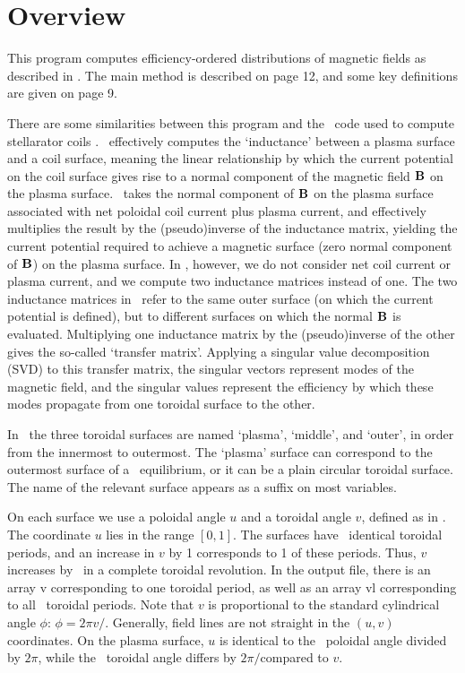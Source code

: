 \chapter{Overview}

This program computes efficiency-ordered distributions of magnetic fields as described in \cite{boozer2015}.  The main method is described on page 12, and some key definitions are given on page 9.

There are some similarities between this program and the \nescoil~code used to compute stellarator coils \cite{nescoil}.
\nescoil~effectively computes the `inductance' between a plasma surface and a coil surface, meaning the linear
relationship by which the current potential on the coil surface gives rise to a normal component of the magnetic field ${\mathbf B}$ on the plasma
surface.  \nescoil~takes the normal component of ${\mathbf B}$ on the plasma surface associated with net poloidal coil current plus plasma
current, and effectively multiplies the result by the (pseudo)inverse of the inductance matrix, yielding the current potential required
to achieve a magnetic surface (zero normal component of ${\mathbf B}$) on the plasma surface.  In \regcoil, however,
we do not consider net coil current or plasma current, and we compute two inductance matrices instead of one.  The two inductance matrices
in \regcoil~refer to the same outer surface (on which the current potential is defined), but to different surfaces on which the normal ${\mathbf B}$
is evaluated. Multiplying one inductance matrix by the (pseudo)inverse of the other gives the so-called `transfer matrix'.
Applying a singular value decomposition (SVD) to this transfer matrix, the singular vectors represent modes of the magnetic field,
and the singular values represent the efficiency by which these modes propagate from one toroidal surface to the other.

In \regcoil~the three toroidal surfaces are named `plasma', `middle', and `outer', in order from the innermost to outermost. The
`plasma' surface can correspond to the outermost surface of a \vmec~equilibrium, or it can be a plain circular toroidal surface. The name
of the relevant surface appears as a suffix on most variables.

On each surface we use a poloidal angle $u$ and a toroidal angle $v$,
defined as in \nescoil.  The coordinate $u$ lies in the range $[0,1]$. The
surfaces have \nfp~identical toroidal periods, and an increase in $v$
by 1 corresponds to 1 of these periods. Thus, $v$ increases by \nfp~in a
complete toroidal revolution. In the output file, there is an array {\ttfamily v}
corresponding to one toroidal period, as well as an array {\ttfamily vl}
corresponding to all \nfp~toroidal periods.  Note that $v$ is
proportional to the standard cylindrical angle $\phi$: $\phi = 2\pi v/$\nfp.
Generally, field lines are not straight in the $(u,v)$ coordinates.  On
the plasma surface, $u$ is identical to the \vmec~poloidal angle divided
by $2\pi$, while the \vmec~toroidal angle differs by $2\pi/$\nfp compared to $v$.

